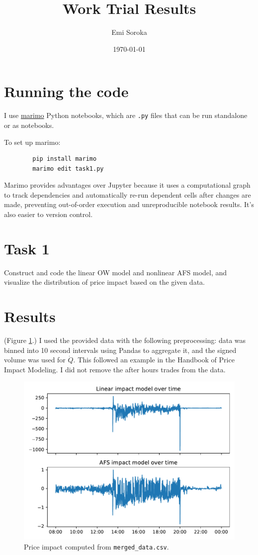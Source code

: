 \documentclass{article}
\title{Work Trial Results}
\author{Emi Soroka}
\date{\today}
\begin{document}
	\maketitle
	\section{Running the code}
	I use \href{https://docs.marimo.io/getting_started/index.html}{marimo} Python notebooks, which are \verb|.py| files that can be run standalone or as notebooks.
	
	To set up marimo:
	\begin{verbatim}
		pip install marimo
		marimo edit task1.py
	\end{verbatim}
	\vspace{-1em}
	Marimo provides advantages over Jupyter because it uses a computational graph to track dependencies and automatically re-run dependent cells after changes are made, preventing out-of-order execution and unreproducible notebook results. It's also  easier to version control.
	
	\section{Task 1} Construct and code the linear OW model and nonlinear AFS model, and visualize the distribution of price impact based on the given data.
	\vspace{-1em}
	\section*{Results} (Figure \ref{fig:task1}.) I used the provided data with the following preprocessing: data was binned into 10 second intervals using Pandas to aggregate it, and the signed volume was used for $\dot Q$. This followed an example in the Handbook of Price Impact Modeling. I did not remove the after hours trades from the data.
	
	\begin{figure}[h]
		\centering
		\includegraphics[width=0.6\linewidth]{figures/task1.pdf}
		\caption{Price impact computed from \texttt{merged\_data.csv}.}
		\label{fig:task1}
	\end{figure}
	
\end{document}
